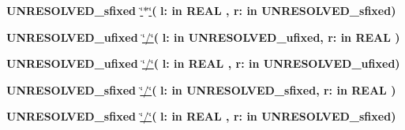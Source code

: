 \begin{DoxyCompactItemize}
\item 
{\bfseries {\bfseries \textcolor{vhdlchar}{U\+N\+R\+E\+S\+O\+L\+V\+E\+D\+\_\+sfixed}\textcolor{vhdlchar}{ }}} \hyperlink{class__fixed__pkg_adc75e260eb741edc3aae92fed900c09a}{\char`\"{}$\ast$\char`\"{}}{\bfseries  ( }{\bfseries \textcolor{vhdlchar}{l\+: }\textcolor{stringliteral}{in }{\bfseries \textcolor{comment}{R\+E\+A\+L}\textcolor{vhdlchar}{ }}}{\bfseries  , \textcolor{vhdlchar}{r\+: }\textcolor{stringliteral}{in }\textcolor{vhdlchar}{U\+N\+R\+E\+S\+O\+L\+V\+E\+D\+\_\+sfixed}}{\bfseries  )} 
\item 
{\bfseries {\bfseries \textcolor{vhdlchar}{U\+N\+R\+E\+S\+O\+L\+V\+E\+D\+\_\+ufixed}\textcolor{vhdlchar}{ }}} \hyperlink{class__fixed__pkg_ab2a8e4ea631432a5f115c76c3e709388}{\char`\"{}/\char`\"{}}{\bfseries  ( }{\bfseries \textcolor{vhdlchar}{l\+: }\textcolor{stringliteral}{in }\textcolor{vhdlchar}{U\+N\+R\+E\+S\+O\+L\+V\+E\+D\+\_\+ufixed}}{\bfseries  , \textcolor{vhdlchar}{r\+: }\textcolor{stringliteral}{in }{\bfseries \textcolor{comment}{R\+E\+A\+L}\textcolor{vhdlchar}{ }}}{\bfseries  )} 
\item 
{\bfseries {\bfseries \textcolor{vhdlchar}{U\+N\+R\+E\+S\+O\+L\+V\+E\+D\+\_\+ufixed}\textcolor{vhdlchar}{ }}} \hyperlink{class__fixed__pkg_ab2a8e4ea631432a5f115c76c3e709388}{\char`\"{}/\char`\"{}}{\bfseries  ( }{\bfseries \textcolor{vhdlchar}{l\+: }\textcolor{stringliteral}{in }{\bfseries \textcolor{comment}{R\+E\+A\+L}\textcolor{vhdlchar}{ }}}{\bfseries  , \textcolor{vhdlchar}{r\+: }\textcolor{stringliteral}{in }\textcolor{vhdlchar}{U\+N\+R\+E\+S\+O\+L\+V\+E\+D\+\_\+ufixed}}{\bfseries  )} 
\item 
{\bfseries {\bfseries \textcolor{vhdlchar}{U\+N\+R\+E\+S\+O\+L\+V\+E\+D\+\_\+sfixed}\textcolor{vhdlchar}{ }}} \hyperlink{class__fixed__pkg_af45777f020bdfeb4078a948c1a3856c3}{\char`\"{}/\char`\"{}}{\bfseries  ( }{\bfseries \textcolor{vhdlchar}{l\+: }\textcolor{stringliteral}{in }\textcolor{vhdlchar}{U\+N\+R\+E\+S\+O\+L\+V\+E\+D\+\_\+sfixed}}{\bfseries  , \textcolor{vhdlchar}{r\+: }\textcolor{stringliteral}{in }{\bfseries \textcolor{comment}{R\+E\+A\+L}\textcolor{vhdlchar}{ }}}{\bfseries  )} 
\item 
{\bfseries {\bfseries \textcolor{vhdlchar}{U\+N\+R\+E\+S\+O\+L\+V\+E\+D\+\_\+sfixed}\textcolor{vhdlchar}{ }}} \hyperlink{class__fixed__pkg_af45777f020bdfeb4078a948c1a3856c3}{\char`\"{}/\char`\"{}}{\bfseries  ( }{\bfseries \textcolor{vhdlchar}{l\+: }\textcolor{stringliteral}{in }{\bfseries \textcolor{comment}{R\+E\+A\+L}\textcolor{vhdlchar}{ }}}{\bfseries  , \textcolor{vhdlchar}{r\+: }\textcolor{stringliteral}{in }\textcolor{vhdlchar}{U\+N\+R\+E\+S\+O\+L\+V\+E\+D\+\_\+sfixed}}{\bfseries  )} 

\end{DoxyCompactItemize}
